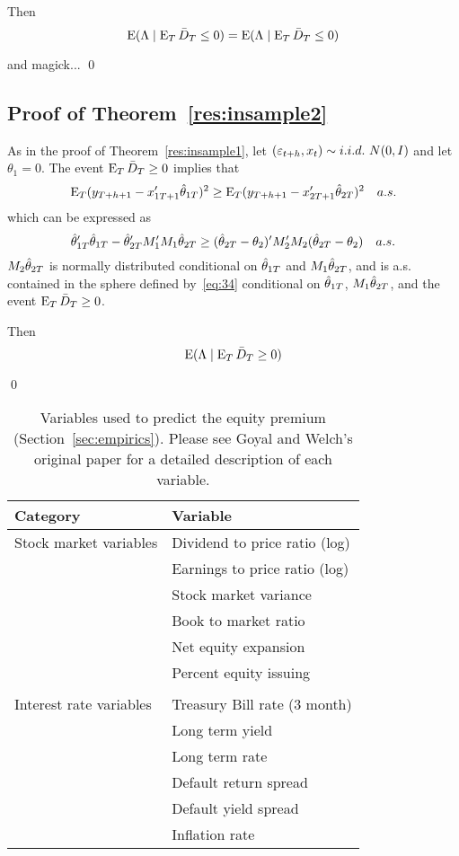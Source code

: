 \documentclass[12pt]{article}
\begin{document}
Then
\begin{equation*}
  \operatorname{E}(\Lambda \mid \operatorname{E}_T \bar{D}_{T} \leq 0)
  =   \operatorname{E}(\Lambda \mid \operatorname{E}_T \bar{D}_{T} \leq 0)
\end{equation*}

and magick...
\qed

\subsection*{Proof of Theorem~\ref{res:insample2}}
As in the proof of Theorem~\ref{res:insample1}, let $(\varepsilon_{t+h}, x_{t})
\sim i.i.d.\ N(0,I)$ and let $\theta_1 = 0$. The event $\operatorname{E}_T \bar{D}_{T}
\geq 0$ implies that
\begin{equation*}
  \operatorname{E}_T (y_{T+h+1} - x_{1T+1}'\hat\theta_{1T})^2
  \geq \operatorname{E}_T (y_{T+h+1} - x_{2T+1}'\hat\theta_{2T})^2 \quad a.s.
\end{equation*}
which can be expressed as
\begin{equation}\label{eq:34}
  \hat\theta_{1T}'\hat\theta_{1T} - \hat\theta_{2T}'M_1'M_1\hat\theta_{2T}
  \geq (\hat\theta_{2T} - \theta_2)' M_2'M_2 (\hat\theta_{2T} - \theta_2) \quad a.s.
\end{equation}
$M_2 \hat\theta_{2T}$ is normally distributed conditional on $\hat\theta_{1T}$ and
$M_1 \hat\theta_{2T}$, and is a.s. contained in the sphere defined
by~\eqref{eq:34} conditional on $\hat\theta_{1T}$, $M_1 \hat\theta_{2T}$, and the
event $\operatorname{E}_T \bar{D}_{T} \geq 0$.

Then
\begin{equation*}
  \operatorname{E}( \Lambda \mid \operatorname{E}_T \bar{D}_{T} \geq 0 )
\end{equation*}

\qed



\clearpage

\begin{table}[tb]
  \begin{tabularx}{\linewidth}{XX}
    \toprule
    Category & Variable \\
    \midrule
    Stock market variables
    & Dividend to price ratio (log) \\
    & Earnings to price ratio (log) \\
    & Stock market variance \\
    & Book to market ratio \\
    & Net equity expansion \\
    & Percent equity issuing \\\\
    Interest rate variables
    & Treasury Bill rate (3 month) \\
    & Long term yield \\
    & Long term rate \\
    & Default return spread \\
    & Default yield spread \\
    & Inflation rate \\
    \bottomrule
  \end{tabularx}
  \caption{Variables used to predict the equity premium
    (Section~\ref{sec:empirics}).
    Please see Goyal and Welch's original paper \citep{GoW:08}
    for a detailed description of each variable.}
  \label{tab:equity}
\end{table}
\end{document}

